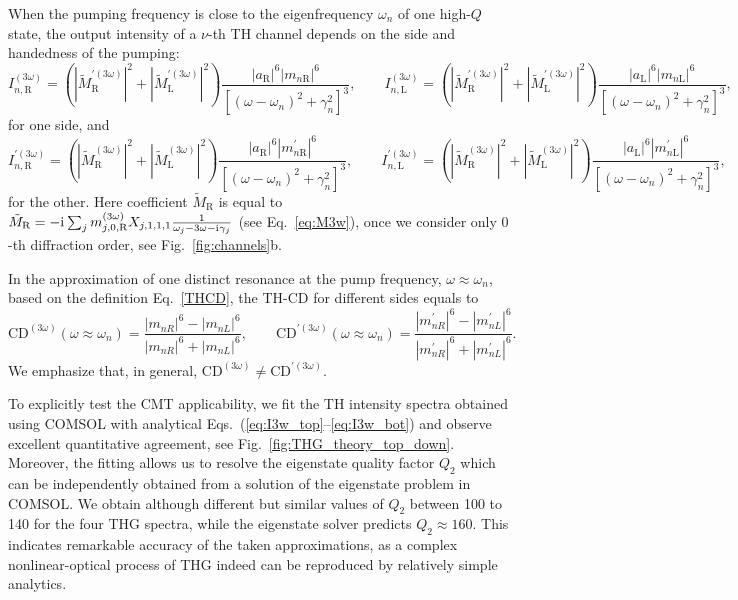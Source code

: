 \documentclass[
    reprint,
    superscriptaddress,
    a4paper,
    amsmath,amssymb,
    prb,
]{revtex4-2}
\newcommand{\iu}{\mathrm{i}\mkern1mu}
\begin{document}
When the pumping frequency is close to the eigenfrequency $\omega_n$ of one high-$Q$ state, the output intensity of a $\nu$-th TH channel  depends on the side and handedness of the pumping:
\begin{equation}
	I^{(3\omega)}_{n,\text{R}} = \left(|\tilde{M}^{\prime (3\omega)}_{\text{R}}|^2 + |\tilde{M}^{\prime(3\omega)}_{\text{L}}|^2 \right) \frac{|a_{\text{R}}|^6|m_{n \text{R}}|^6}{[(\omega-\omega_n)^2+{\gamma}_n^2]^3},	\qquad 
	I^{(3\omega)}_{n,\text{L}}= \left(|\tilde{M}^{\prime(3\omega)}_{\text{R}}|^2 + |\tilde{M}^{\prime(3\omega)}_{\text{L}}|^2 \right)\frac{|a_{\text{L}}|^6|m_{n\text{L}}|^6}{[(\omega-\omega_n)^2+{\gamma}_n^2]^3},	
	\label{eq:I3w_top}
\end{equation}
for one side, and  
\begin{equation}
	I^{\prime (3\omega)}_{n,\text{R}}= \left(|\tilde{M}^{ (3\omega)}_{\text{R}}|^2 + |\tilde{M}^{ (3\omega)}_{\text{L}}|^2 \right)\frac{|a_{\text{R}}|^6|m^{\prime}_{n \text{R}}|^6}{[(\omega-\omega_n)^2+{\gamma}_n^2]^3},	\qquad 
	I^{\prime (3\omega)}_{n,\text{L}} = \left(|\tilde{M}^{ (3\omega)}_{\text{R}}|^2 + |\tilde{M}^{(3\omega)}_{\text{L}}|^2 \right) \frac{|a_{\text{L}}|^6|m^{\prime}_{n\text{L}}|^6}{[(\omega-\omega_n)^2+{\gamma}_n^2]^3},	
	\label{eq:I3w_bot}
\end{equation}
for the other. Here coefficient $\tilde{M}_{\text{R}}$ is equal to  $\tilde{M}_{\text{R}} = - \iu \sum_j m^{(3\omega)}_{j,0, \text{R}} X_{j,1,1,1} \frac{1}{\omega_j - 3\omega - \iu \gamma_j}$ (see Eq.~\eqref{eq:M3w}), once we consider only $0$-th diffraction order, see Fig.~\ref{fig:channels}b. 

In the approximation of one distinct resonance at the pump frequency, $\omega \approx \omega_n$, based on the definition Eq.~\eqref{THCD}, the TH-CD for different sides equals to
\begin{equation}\label{THCD1}
	\mathrm{CD}^{(3\omega)} (\omega \approx \omega_n) = \frac{|m_{nR}|^6-|m_{nL}|^6}{|m_{nR}|^6+|m_{nL}|^6}, \qquad 
	\mathrm{CD}^{\prime (3\omega)} (\omega \approx \omega_n) = \frac{|m^{\prime}_{nR}|^6-|m^{\prime}_{nL}|^6}{|m^{\prime}_{nR}|^6+|m^{\prime}_{nL}|^6}.
\end{equation}
We emphasize that, in general, $\mathrm{CD}^{(3\omega)} \neq \mathrm{CD}^{\prime (3\omega)}$.

To explicitly test the CMT applicability, we fit the TH intensity spectra obtained using COMSOL with analytical Eqs.~(\ref{eq:I3w_top}--\ref{eq:I3w_bot}) and observe excellent quantitative agreement, see Fig.~\ref{fig:THG_theory_top_down}. Moreover, the fitting allows us to resolve the eigenstate quality factor $Q_2$ which can be independently obtained from a solution of the eigenstate problem in COMSOL. We obtain although different but similar values of $Q_2$ between 100 to 140 for the four THG spectra, while the eigenstate solver predicts $Q_2\approx160$. This indicates remarkable accuracy of the taken approximations, as a complex nonlinear-optical process of THG indeed can be reproduced by relatively simple analytics.
\end{document}
